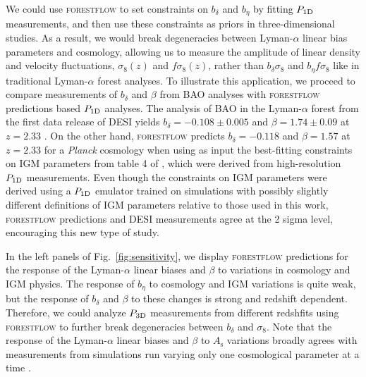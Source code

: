 \documentclass{aa}
\newcommand{\lya}{Lyman-$\alpha$\xspace}
\newcommand{\lyaf}{Lyman-$\alpha$ forest\xspace}
\newcommand{\poned}{\ensuremath{P_{\rm 1D}}\xspace}
\newcommand{\pthreed}{\ensuremath{P_{\rm 3D}}\xspace}
\newcommand{\forestflow}{\textsc{forestflow}\xspace}
\begin{document}
We could use \forestflow to set constraints on $b_\delta$ and $b_\eta$ by fitting \poned measurements, and then use these constraints as priors in three-dimensional studies. As a result, we would break degeneracies between \lya linear bias parameters and cosmology, allowing us to measure the amplitude of linear density and velocity fluctuations, $\sigma_8(z)$ and $f \sigma_8(z)$, rather than $b_\delta \sigma_8$ and $b_\eta f \sigma_8$ like in traditional \lyaf analyses. To illustrate this application, we proceed to compare measurements of $b_\delta$ and $\beta$ from BAO analyses with \forestflow predictions based \poned analyses. The analysis of BAO in the \lyaf from the first data release of DESI yields $b_\delta=-0.108\pm0.005$ and $\beta=1.74\pm0.09$ at $z=2.33$ \citep{desicollaboration2024DESI2024IV}. On the other hand, \forestflow predicts $b_\delta=-0.118$ and $\beta=1.57$ at $z=2.33$ for a {\it Planck} cosmology when using as input the best-fitting constraints on IGM parameters from table 4 of \citet{emugp_Walther2019}, which were derived from high-resolution \poned measurements. Even though the constraints on IGM parameters were derived using a \poned emulator trained on simulations with possibly slightly different definitions of IGM parameters relative to those used in this work, \forestflow predictions and DESI measurements agree at the 2 sigma level, encouraging this new type of study.

In the left panels of Fig.~\ref{fig:sensitivity}, we display \forestflow predictions for the response of the \lya linear biases and $\beta$ to variations in cosmology and IGM physics. The response of $b_\eta$ to cosmology and IGM variations is quite weak, but the response of $b_\delta$ and $\beta$ to these changes is strong and redshift dependent. Therefore, we could analyze \pthreed measurements from different redshfits using \forestflow to further break degeneracies between $b_\delta$ and $\sigma_8$. Note that the response of the \lya linear biases and $\beta$ to $A_\mathrm{s}$ variations broadly agrees with measurements from simulations run varying only one cosmological parameter at a time \citep{arinyo-i-prats2015NonlinearPowerSpectrum}.
\end{document}

